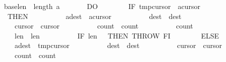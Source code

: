 \begin{isabellebody}
\ \ \ \ \ \ \ {\isacharparenleft}\isactrlbsup {\isasymsigma}\isactrlesup base{}{\isacharplus}\isactrlbsup {\isasymsigma}\isactrlesup len{}\ {\isasymle}\ length\ \isactrlbsup {\isasymsigma}\isactrlesup a{\isacharparenright}\ {\isasymrbrace}\isanewline
\ \ \ \ \ \ DO\isanewline
\ \ \ \ \ \ \ \ IF\ {\isasymacute}tmp{\isacharbang}{\isasymacute}cursor{}\ {\isacharless}\ {\isasymacute}a{\isacharbang}{\isasymacute}cursor{}\isanewline
\ \ \ \ \ \ \ \ THEN\isanewline
\ \ \ \ \ \ \ \ \ \ {\isasymacute}a{\isacharbang}{\isasymacute}dest\ {\isacharcolon}{\isacharequal}{\isacharequal}\ {\isasymacute}a{\isacharbang}{\isasymacute}cursor{}{\isacharsemicolon}{\isacharsemicolon}\isanewline
\ \ \ \ \ \ \ \ \ \ {\isasymacute}dest\ {\isacharcolon}{\isacharequal}{\isacharequal}\ {\isasymacute}dest{\isacharminus}{}{\isacharsemicolon}{\isacharsemicolon}\isanewline
\ \ \ \ \ \ \ \ \ \ {\isasymacute}cursor{}\ {\isacharcolon}{\isacharequal}{\isacharequal}\ {\isasymacute}cursor{}{\isacharminus}{}{\isacharsemicolon}{\isacharsemicolon}\isanewline
\ \ \ \ \ \ \ \ \ \ {\isasymacute}count{}\ {\isacharcolon}{\isacharequal}{\isacharequal}\ {\isasymacute}count{}{\isacharplus}{}{\isacharsemicolon}{\isacharsemicolon}\isanewline
\ \ \ \ \ \ \ \ \ \ {\isasymacute}count{}\ {\isacharcolon}{\isacharequal}{\isacharequal}\ {}{\isacharsemicolon}{\isacharsemicolon}\isanewline
\ \ \ \ \ \ \ \ \ \ {\isasymacute}len{}\ {\isacharcolon}{\isacharequal}{\isacharequal}\ {\isasymacute}len{}{\isacharminus}{}{\isacharsemicolon}{\isacharsemicolon}\isanewline
\ \ \ \ \ \ \ \ \ \ IF\ {\isasymacute}len{}\ {\isacharequal}\ {}\ THEN\ THROW\ FI\isanewline
\ \ \ \ \ \ \ \ ELSE\isanewline
\ \ \ \ \ \ \ \ \ \ {\isasymacute}a{\isacharbang}{\isasymacute}dest\ {\isacharcolon}{\isacharequal}{\isacharequal}\ {\isasymacute}tmp{\isacharbang}{\isasymacute}cursor{}{\isacharsemicolon}{\isacharsemicolon}\isanewline
\ \ \ \ \ \ \ \ \ \ {\isasymacute}dest\ {\isacharcolon}{\isacharequal}{\isacharequal}\ {\isasymacute}dest{\isacharminus}{}{\isacharsemicolon}{\isacharsemicolon}\isanewline
\ \ \ \ \ \ \ \ \ \ {\isasymacute}cursor{}\ {\isacharcolon}{\isacharequal}{\isacharequal}\ {\isasymacute}cursor{}{\isacharminus}{}{\isacharsemicolon}{\isacharsemicolon}\isanewline
\ \ \ \ \ \ \ \ \ \ {\isasymacute}count{}\ {\isacharcolon}{\isacharequal}{\isacharequal}\ {\isasymacute}count{}{\isacharplus}{}{\isacharsemicolon}{\isacharsemicolon}\isanewline

\end{isabellebody}
